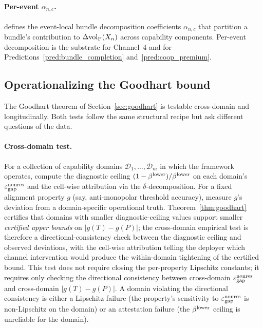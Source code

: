 \paragraph{Per-event $\alpha_{n,c}$.}
\citep[Definition~4]{lasser2026paper8a} defines the
event-local bundle decomposition coefficients $\alpha_{n,c}$
that partition a bundle's contribution to $\Delta{\operatorname{vol}_{\mathrm{P}}}(X_n)$
across capability components.  Per-event decomposition is the
substrate for Channel~4 and for
Predictions~\ref{pred:bundle_completion}
and~\ref{pred:coop_premium}.

\subsection{Operationalizing the Goodhart bound}
\label{sec:operationalizing}

The Goodhart theorem of Section~\ref{sec:goodhart} is testable
cross-domain and longitudinally.  Both tests follow the same
structural recipe but ask different questions of the data.

\paragraph{Cross-domain test.}
For a collection of capability domains $\mathcal{D}_1, \dots,
\mathcal{D}_m$ in which the framework operates, compute the
diagnostic ceiling $(1 - \beta^{\mathrm{lower}})/\beta^{\mathrm{lower}}$ on each domain's
$\varepsilon_{\mathrm{gap}}^{\mathrm{nonres}}$ and the cell-wise attribution via the
$\delta$-decomposition.  For a fixed alignment property $g$
(say, anti-monopolar threshold accuracy), measure $g$'s
deviation from a domain-specific operational truth.
Theorem~\ref{thm:goodhart} certifies that domains with
smaller diagnostic-ceiling values support smaller \emph{certified
upper bounds} on $|g(T) - g(P)|$; the cross-domain empirical
test is therefore a directional-consistency check between the
diagnostic ceiling and observed deviations, with the cell-wise
attribution telling the deployer which channel intervention
would produce the within-domain tightening of the certified
bound.  This test does not require closing the per-property
Lipschitz constants; it requires only checking the directional
consistency between cross-domain $\varepsilon_{\mathrm{gap}}^{\mathrm{nonres}}$ and cross-domain
$|g(T) - g(P)|$.  A domain
violating the directional consistency is either a Lipschitz
failure (the property's sensitivity to $\varepsilon_{\mathrm{gap}}^{\mathrm{nonres}}$ is
non-Lipschitz on the domain) or an attestation failure (the
$\beta^{\mathrm{lower}}$ ceiling is unreliable for the domain).


